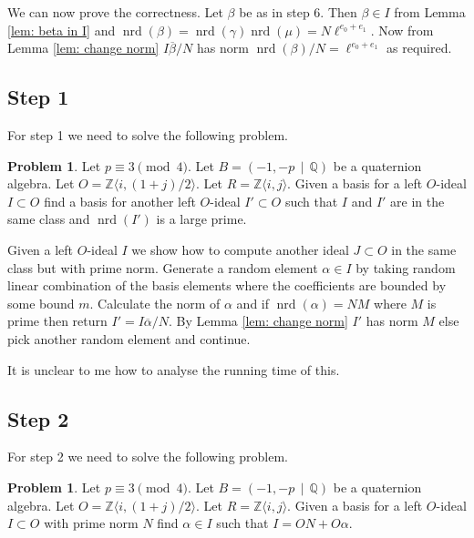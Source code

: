 \documentclass[10pt]{article}
\theoremstyle{plain}
\theoremstyle{definition}
\newtheorem{prob}[theorem]{Problem}
\newcommand{\op}{\operatorname}
\newcommand{\Z}{\mathbb{Z}}
\newcommand{\Q}{\mathbb{Q}}
\newcommand{\nrd}{\op{nrd}}
\begin{document}
We can now prove the correctness.
Let \( \beta \) be as in step 6.
Then \( \beta \in I \) from Lemma \ref{lem: beta in I} and \( \nrd(\beta) = \nrd(\gamma) \nrd(\mu) = N\ell^{e_0 + e_1} \).
Now from Lemma \ref{lem: change norm} \( I\overline{\beta}/N \) has norm \( \nrd(\beta) / N = \ell^{e_0 + e_1} \) as required.

\subsection{Step 1}
For step 1 we need to solve the following problem.

\begin{prob}
    Let \( p \equiv 3 \pmod{4} \).
    Let \( B =  (-1, -p \, \mid \, \Q) \) be a quaternion algebra.
    Let \( O = \Z \langle i, (1+j) / 2 \rangle \).
    Let \( R = \Z \langle i , j \rangle \).
    Given a basis for a left \( O \)-ideal \( I \subset O \) find a basis for another left \( O \)-ideal \( I' \subset O \) such that \( I \) and \( I' \) are in the same class and \( \nrd(I') \) is a large prime.
\end{prob}

Given a left \( O \)-ideal \( I \) we show how to compute another ideal \( J \subset O \) in the same class but with prime norm.
Generate a random element \( \alpha \in I \) by taking random linear combination of the basis elements where the coefficients are bounded by some bound \( m \).
Calculate the norm of \( \alpha \) and if \( \nrd(\alpha) = NM \) where \( M \) is prime then return \( I' = I \overline{\alpha} / N \).
By Lemma \ref{lem: change norm} \( I' \) has norm \( M \) else pick another random element and continue.

{\color{red} It is unclear to me how to analyse the running time of this.}


\subsection{Step 2}
For step 2 we need to solve the following problem.

\begin{prob}
    Let \( p \equiv 3 \pmod{4} \).
    Let \( B =  (-1, -p \, \mid \, \Q) \) be a quaternion algebra.
    Let \( O = \Z \langle i, (1+j) / 2 \rangle \).
    Let \( R = \Z \langle i , j \rangle \).
    Given a basis for a left \( O \)-ideal \( I \subset O \) with prime norm \( N \) find \( \alpha \in I \) such that \( I = ON + O\alpha \).
\end{prob}
\end{document}
